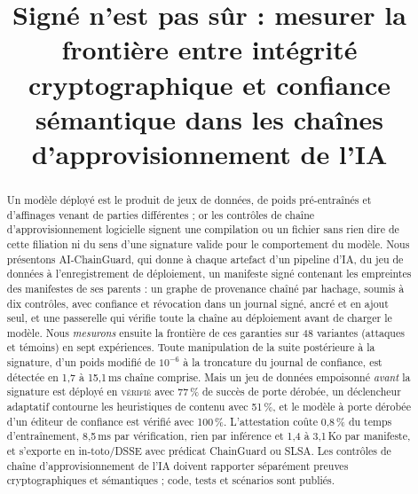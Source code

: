 \documentclass[conference]{IEEEtran}
\newcommand{\sys}{AI-ChainGuard}
\newcommand{\st}[1]{\textsc{#1}}
\begin{document}
\title{Signé n'est pas sûr : mesurer la frontière entre intégrité cryptographique et confiance sémantique dans les chaînes d'approvisionnement de l'IA}

\author{
}

\maketitle

\begin{abstract}
Un modèle déployé est le produit de jeux de données, de poids pré-entraînés et d'affinages venant de parties différentes ; or les contrôles de chaîne d'approvisionnement logicielle signent une compilation ou un fichier sans rien dire de cette filiation ni du sens d'une signature valide pour le comportement du modèle. Nous présentons \sys, qui donne à chaque artefact d'un pipeline d'IA, du jeu de données à l'enregistrement de déploiement, un manifeste signé contenant les empreintes des manifestes de ses parents : un graphe de provenance chaîné par hachage, soumis à dix contrôles, avec confiance et révocation dans un journal signé, ancré et en ajout seul, et une passerelle qui vérifie toute la chaîne au déploiement avant de charger le modèle. Nous \emph{mesurons} ensuite la frontière de ces garanties sur 48 variantes (attaques et témoins) en sept expériences. Toute manipulation de la suite postérieure à la signature, d'un poids modifié de $10^{-6}$ à la troncature du journal de confiance, est détectée en 1,7 à 15,1\,ms chaîne comprise. Mais un jeu de données empoisonné \emph{avant} la signature est déployé en \st{vérifié} avec 77\,\% de succès de porte dérobée, un déclencheur adaptatif contourne les heuristiques de contenu avec 51\,\%, et le modèle à porte dérobée d'un éditeur de confiance est vérifié avec 100\,\%. L'attestation coûte 0,8\,\% du temps d'entraînement, 8,5\,ms par vérification, rien par inférence et 1,4 à 3,1\,Ko par manifeste, et s'exporte en in-toto/DSSE avec prédicat ChainGuard ou SLSA. Les contrôles de chaîne d'approvisionnement de l'IA doivent rapporter séparément preuves cryptographiques et sémantiques ; code, tests et scénarios sont publiés.
\end{abstract}
\end{document}
